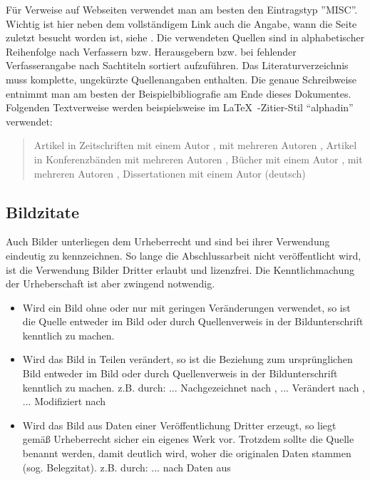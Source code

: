 Für Verweise auf Webseiten verwendet man am besten den Eintragstyp ''MISC''. Wichtig ist hier neben dem vollständigem Link auch die Angabe, wann die Seite zuletzt besucht worden ist, siehe
\cite{medit2007}.
Die verwendeten Quellen sind in alphabetischer Reihenfolge nach Verfassern bzw. Herausgebern bzw.
bei fehlender Verfasserangabe nach Sachtiteln sortiert aufzuführen. Das Literaturverzeichnis muss
komplette, ungekürzte Quellenangaben enthalten. Die genaue Schreibweise entnimmt man am besten der
Beispielbibliografie am Ende dieses Dokumentes.
Folgenden Textverweise werden beispielsweise im \LaTeX\ -Zitier-Stil "`alphadin"' verwendet:
\begin{quotation}
	Artikel in Zeitschriften mit einem Autor \cite{Akaike1974a}, mit mehreren Autoren
	\cite{Aschoff1999a}, Artikel in Konferenzbänden mit mehreren Autoren \cite{Walter12.-16.6.1998a},
	Bücher mit einem Autor \cite{Schiller:Tell}, mit mehreren Autoren \cite{Goossens:LatexBegleiter},
	Dissertationen mit einem Autor (deutsch) \cite{walter2002}
\end{quotation}


\subsection{Bildzitate}
Auch Bilder unterliegen dem Urheberrecht und sind bei ihrer Verwendung eindeutig zu kennzeichnen. So lange die Abschlussarbeit nicht veröffentlicht wird, ist die Verwendung Bilder Dritter erlaubt und lizenzfrei. Die Kenntlichmachung der Urheberschaft ist aber zwingend notwendig.

\begin{itemize}
	\item Wird ein Bild ohne oder nur mit geringen Veränderungen verwendet, so ist die Quelle entweder im Bild oder durch Quellenverweis in der Bildunterschrift kenntlich zu machen.
	\item Wird das Bild in Teilen verändert, so ist die Beziehung zum ursprünglichen Bild entweder im Bild oder durch Quellenverweis in der Bildunterschrift kenntlich zu machen. z.B. durch: ... Nachgezeichnet nach \cite{walter2002}, ... Verändert nach \cite{Aschoff1999a}, ... Modifiziert nach \cite{walter2002}
	\item Wird das Bild aus Daten einer Veröffentlichung Dritter erzeugt, so liegt gemäß Urheberrecht sicher ein eigenes Werk vor. Trotzdem sollte die Quelle benannt werden, damit deutlich wird, woher die originalen Daten stammen (sog. Belegzitat). z.B. durch: ... nach Daten aus \cite{Akaike1974a}
\end{itemize}

